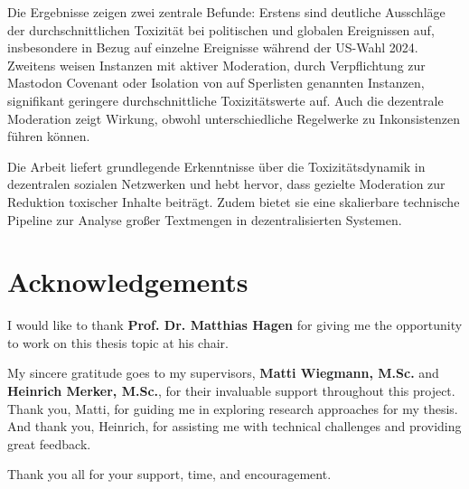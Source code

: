 \documentclass[english,bachelor,fsu]{webisthesis} %
\begin{document}
\begin{frontmatter}
Die Ergebnisse zeigen zwei zentrale Befunde: Erstens sind deutliche Ausschläge der durchschnittlichen Toxizität bei politischen und globalen Ereignissen auf, insbesondere in Bezug auf einzelne Ereignisse während der US-Wahl 2024. Zweitens weisen Instanzen mit aktiver Moderation, durch Verpflichtung zur Mastodon Covenant oder Isolation von auf Sperlisten genannten Instanzen, signifikant geringere durchschnittliche Toxizitätswerte auf. Auch die dezentrale Moderation zeigt Wirkung, obwohl unterschiedliche Regelwerke zu Inkonsistenzen führen können.

Die Arbeit liefert grundlegende Erkenntnisse über die Toxizitätsdynamik in dezentralen sozialen Netzwerken und hebt hervor, dass gezielte Moderation zur Reduktion toxischer Inhalte beiträgt. Zudem bietet sie eine skalierbare technische Pipeline zur Analyse großer Textmengen in dezentralisierten Systemen.

\tableofcontents

\chapter*{Acknowledgements}
I would like to thank \textbf{Prof. Dr. Matthias Hagen} for giving me the opportunity to work on this thesis topic at his chair.

My sincere gratitude goes to my supervisors, \textbf{Matti Wiegmann, M.Sc.} and \textbf{Heinrich Merker, M.Sc.}, for their invaluable support throughout this project. Thank you, Matti, for guiding me in exploring research approaches for my thesis. And thank you, Heinrich, for assisting me with technical challenges and providing great feedback.

Thank you all for your support, time, and encouragement.




\end{frontmatter}









\printbibliography


\end{document}
